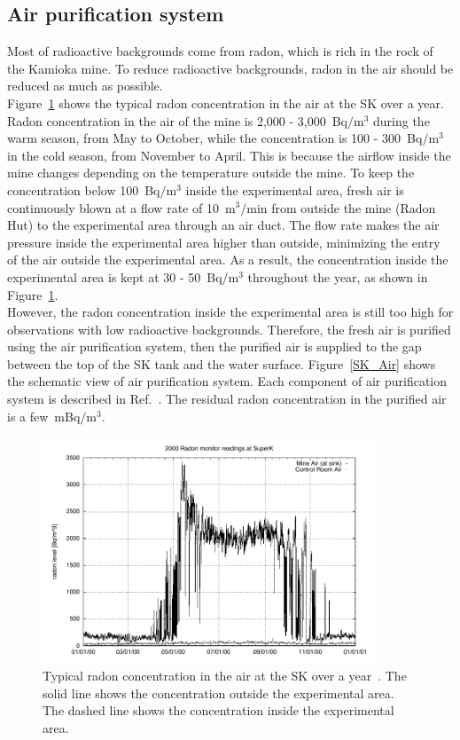 \subsection{Air purification system}
\vs\hs
Most of radioactive backgrounds come from radon, which is rich in the rock of the Kamioka mine.
To reduce radioactive backgrounds, radon in the air should be reduced as much as possible.\\
\hs
Figure~\ref{SK_AirSeason} shows the typical radon concentration in the air at the SK over a year.
Radon concentration in the air of the mine is 2,000 - 3,000~Bq$/$m$^{\text{3}}$ during the warm season, from May to October, while the concentration is 100 - 300~Bq$/$m$^{\text{3}}$ in the cold season, from November to April.
This is because the airflow inside the mine changes depending on the temperature outside the mine.
To keep the concentration below 100~Bq$/$m$^{\text{3}}$ inside the experimental area, fresh air is continuously blown at a flow rate of 10~m$^{\text{3}}/$min from outside the mine (Radon Hut) to the experimental area through an air duct.
The flow rate makes the air pressure inside the experimental area higher than outside, minimizing the entry of the air outside the experimental area.
As a result, the concentration inside the experimental area is kept at 30 - 50~Bq$/$m$^{\text{3}}$ throughout the year, as shown in Figure~\ref{SK_AirSeason}.\\
\hs
However, the radon concentration inside the experimental area is still too high for observations with low radioactive backgrounds.
Therefore, the fresh air is purified using the air purification system, then the purified air is supplied to the gap between the top of the SK tank and the water surface.
Figure~\ref{SK_Air} shows the schematic view of air purification system.
Each component of air purification system is described in Ref.~\cite{2015NakanoPhD}.
The residual radon concentration in the purified air is a few~mBq$/$m$^{\text{3}}$.

\begin{figure}[H]
	\centering
	\includegraphics[width=10cm]{Figures/SK/AirSeason}
	\caption[Typical radon concentration in the air at the SK over a year]{
	Typical radon concentration in the air at the SK over a year~\cite{2003Fukuda}.
	The solid line shows the concentration outside the experimental area.
	The dashed line shows the concentration inside the experimental area.
	}\label{SK_AirSeason}
\end{figure}

